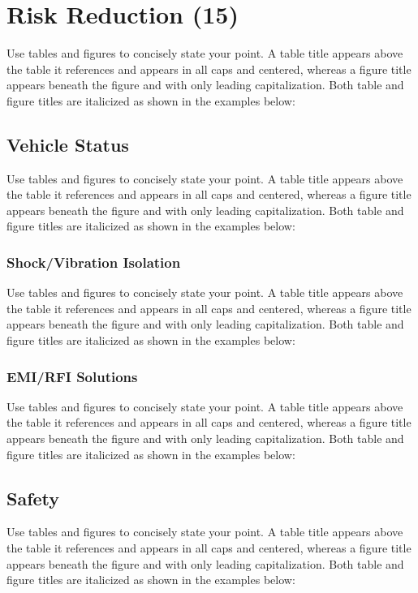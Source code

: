 \documentclass[12pt, letterpaper]{article}
\begin{document}
\section{Risk Reduction (15)}
Use tables and figures to concisely state your point. A table title appears above the table it references and appears in all caps and centered, whereas a figure title appears beneath the figure and with only leading capitalization. Both table and figure titles are italicized as shown in the examples below:

\subsection{Vehicle Status}
Use tables and figures to concisely state your point. A table title appears above the table it references and appears in all caps and centered, whereas a figure title appears beneath the figure and with only leading capitalization. Both table and figure titles are italicized as shown in the examples below:

\subsubsection{Shock/Vibration Isolation}
Use tables and figures to concisely state your point. A table title appears above the table it references and appears in all caps and centered, whereas a figure title appears beneath the figure and with only leading capitalization. Both table and figure titles are italicized as shown in the examples below:

\subsubsection{EMI/RFI Solutions}
Use tables and figures to concisely state your point. A table title appears above the table it references and appears in all caps and centered, whereas a figure title appears beneath the figure and with only leading capitalization. Both table and figure titles are italicized as shown in the examples below:

\subsection{Safety}
Use tables and figures to concisely state your point. A table title appears above the table it references and appears in all caps and centered, whereas a figure title appears beneath the figure and with only leading capitalization. Both table and figure titles are italicized as shown in the examples below:
\end{document}
